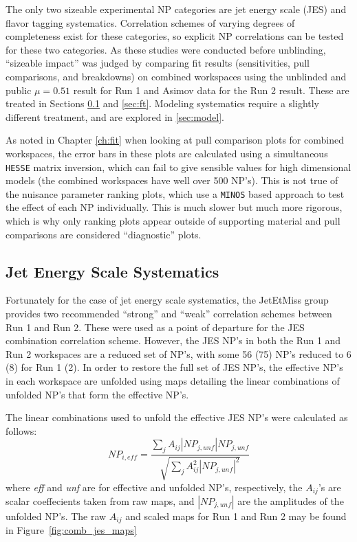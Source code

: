 The only two sizeable experimental NP categories are jet energy scale (JES) and flavor tagging systematics.  Correlation schemes of varying degrees of completeness exist for these categories, so explicit NP correlations can be tested for these two categories.  As these studies were conducted before unblinding, ``sizeable impact'' was judged by comparing fit results (sensitivities, pull comparisons, and breakdowns) on combined workspaces using the unblinded and public $\mu=0.51$ result for Run 1 and Asimov data for the Run 2 result.  These are treated in Sections \ref{sec:jes} and \ref{sec:ft}.  Modeling systematics require a slightly different treatment, and are explored in \ref{sec:model}.

As noted in Chapter \ref{ch:fit} when looking at pull comparison plots for combined workspaces, the error bars in these plots are calculated using a simultaneous \texttt{HESSE} matrix inversion, which can fail to give sensible values for high dimensional models (the combined workspaces have well over 500 NP's).  This is not true of the nuisance parameter ranking plots, which use a \texttt{MINOS} based approach to test the effect of each NP individually.  This is much slower but much more rigorous, which is why only ranking plots appear outside of supporting material and pull comparisons are considered ``diagnostic'' plots.

\subsection{Jet Energy Scale Systematics}
\label{sec:jes}
Fortunately for the case of jet energy scale systematics, the JetEtMiss group provides two recommended ``strong'' and ``weak'' correlation schemes between Run 1 and Run 2.  These were used as a point of departure for the JES combination correlation scheme.  However, the JES NP's in both the Run 1 and Run 2 workspaces are a reduced set of NP's, with some 56 (75) NP's reduced to 6 (8) for Run 1 (2).  In order to restore the full set of JES NP's, the effective NP's in each workspace are unfolded using maps detailing the linear combinations of unfolded NP's that form the effective NP's.  


The linear combinations used to unfold the effective JES NP's were calculated as follows:
\begin{equation}
NP_{i,eff} = \frac{\sum_j A_{ij} \left|NP_{j,unf}\right| NP_{j,unf}}{\sqrt{\sum_j A_{ij}^2 \left|NP_{j,unf}\right|^2 }}
\end{equation}
where \textit{eff} and \textit{unf} are for effective and unfolded NP's, respectively, the $A_{ij}$'s are scalar coeffecients taken from raw maps, and $\left|NP_{j,unf}\right|$ are the amplitudes of the unfolded NP's.  The raw $A_{ij}$ and scaled maps for Run 1 and Run 2 may be found in Figure~\ref{fig:comb_jes_maps}


